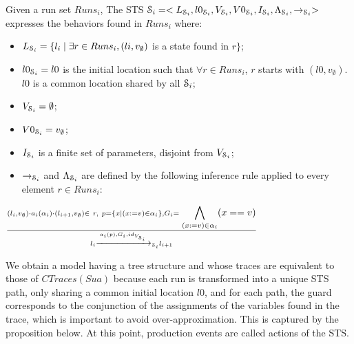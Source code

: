 \begin{definition}
Given a run set $Runs_i$, The STS $\EuScript{S}_i=<L_{\EuScript{S}_i},
  l0_{\EuScript{S}_i},V_{\EuScript{S}_i},\\V0_{\EuScript{S}_i},
  I_{\EuScript{S}_i}, \Lambda_{\EuScript{S}_i},\rightarrow_{\EuScript{S}_i}>$
  expresses the behaviors found in $Runs_i$ where:

	\begin{itemize}
    \item $L_{\EuScript{S}_i}= \{l_i \mid \exists r\in Runs_i,
      (li,v_\emptyset)$ is a state found in $r\}$;

    \item $l0_{\EuScript{S}_i} = l0$ is the initial location
      such that $\forall r \in Runs_i$, $r$ starts with
      $(l0,v_\emptyset)$. $l0$ is a common location shared by all
      $\EuScript{S}_i$;

    \item $V_{\EuScript{S}_i}=\emptyset$;

    \item $V0_{\EuScript{S}_i}=v_\emptyset$;

   \item $I_{\EuScript{S}_i}$ is a finite set of parameters,
        disjoint from $V_{\EuScript{S}_i}$;

    \item $\rightarrow_{\EuScript{S}_i}$ and
      $\Lambda_{\EuScript{S}_i}$ are defined by the following
      inference rule applied to every element $r\in Runs_i$:
	\end{itemize}

  \begin{center}
    {\Large
        $\frac{(l_i,v_\emptyset) \cdot a_i(\alpha_i) \cdot (l_{i+1},v_\emptyset)
        \in ~r, ~p = \{x \mid (x:=v)\in \alpha_i \}, G_i=\displaystyle
        \bigwedge_{(x:=v)\in \alpha_i}(x == v)}
        {l_i \xrightarrow{a_i(p),G_i,id_{V_{\EuScript{S}_i}}}_{\EuScript{S}_i} l_{i+1}}$
    }
  \end{center}


  \label{def:runset_to_sts}
\end{definition}

We obtain a model having a tree structure and whose traces are
equivalent \cite{petrenko06} to those of $CTraces(Sua)$ because
each run is transformed into a unique STS path, only sharing a
common initial location $l0$, and for each path, the guard
corresponds to the conjunction of the assignments of the
variables found in the trace, which is important to avoid
over-approximation. This is captured by the proposition below. At
this point, production events are called actions of the STS.

